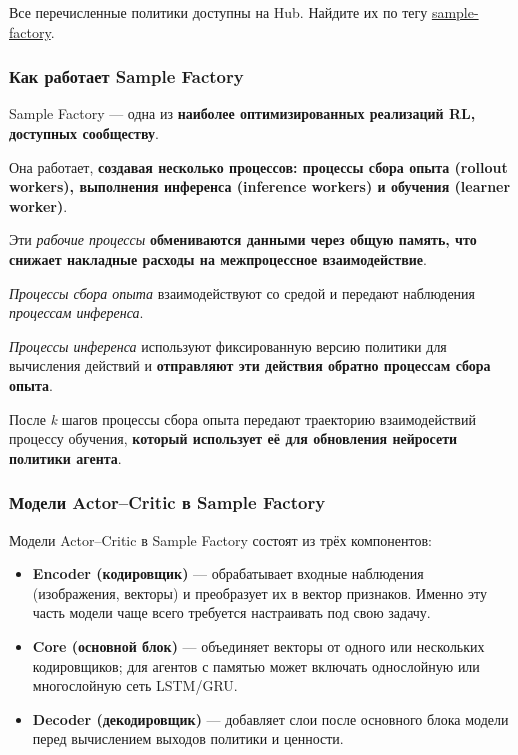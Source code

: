 \documentclass[11pt,a4paper]{article}
\begin{document}
Все перечисленные политики доступны на Hub. Найдите их по тегу \href{https://huggingface.co/models?library=sample-factory&sort=downloads}{sample-factory}.

\subsubsection{Как работает Sample Factory}\label{how-sample-factory-works}

Sample Factory --- одна из \textbf{наиболее оптимизированных реализаций RL, доступных сообществу}.

Она работает, \textbf{создавая несколько процессов: процессы сбора опыта (rollout workers), выполнения инференса (inference workers) и обучения (learner worker)}.

Эти \emph{рабочие процессы} \textbf{обмениваются данными через общую память, что снижает накладные расходы на межпроцессное взаимодействие}.

\emph{Процессы сбора опыта} взаимодействуют со средой и передают наблюдения \emph{процессам инференса}.

\emph{Процессы инференса} используют фиксированную версию политики для вычисления действий и \textbf{отправляют эти действия обратно процессам сбора опыта}.

После \emph{k} шагов процессы сбора опыта передают траекторию взаимодействий процессу обучения, \textbf{который использует её для обновления нейросети политики агента}.


\subsubsection{Модели Actor–Critic в Sample Factory}\label{actor-critic-models-in-sample-factory}

Модели Actor–Critic в Sample Factory состоят из трёх компонентов:

\begin{itemize}
\tightlist
\item
  \textbf{Encoder (кодировщик)} --- обрабатывает входные наблюдения (изображения, векторы) и преобразует их в вектор признаков. Именно эту часть модели чаще всего требуется настраивать под свою задачу.
\item
  \textbf{Core (основной блок)} --- объединяет векторы от одного или нескольких кодировщиков; для агентов с памятью может включать однослойную или многослойную сеть LSTM/GRU.
\item
  \textbf{Decoder (декодировщик)} --- добавляет слои после основного блока модели перед вычислением выходов политики и ценности.
\end{itemize}
\end{document}
